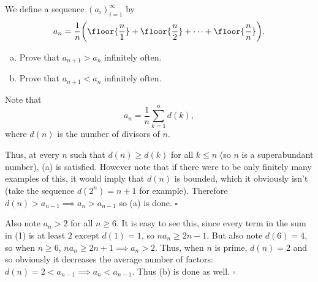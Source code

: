 
\begin{problem}[ISL 2006 N3]
    We define a sequence $(a_i)_{i=1}^\infty$ by
    \[a_n = \frac1n\bigg(\floor{\frac n1} + \floor{\frac n2} + \cdots + \floor{\frac nn}\bigg).\]
    \begin{enumerate}[(a),itemsep=-6pt]
        \item Prove that $a_{n+1}>a_n$ infinitely often.
        \item Prove that $a_{n+1}<a_n$ infinitely often.
    \end{enumerate}
\end{problem}

\begin{solution}[Ritwin]
    Note that \[a_n = \frac1n \sum_{k=1}^n d(k), \tag{1}\]
    where $d(n)$ is the number of divisors of $n$.
    
    Thus, at every $n$ such that $d(n) \geq d(k)$ for all $k \leq n$ (so $n$ is
    a superabundant number), (a) is satisfied. However note that if there were
    to be only finitely many examples of this, it would imply that $d(n)$ is
    bounded, which it obviously isn't (take the sequence $d(2^n) = n+1$ for example).
    Therefore $d(n) > a_{n-1} \implies a_n > a_{n-1}$ so (a) is done. $\square$
    
    Also note $a_n > 2$ for all $n \geq 6$. It is easy to see this, since every
    term in the sum in (1) is at least $2$ except $d(1) = 1$, so $na_n \geq 2n-1$.
    But also note $d(6) = 4$, so when $n \geq 6$, $na_n \geq 2n+1 \implies a_n > 2$.
    Thus, when $n$ is prime, $d(n) = 2$ and so obviously it decreases the average
    number of factors: $d(n) = 2 < a_{n-1} \implies a_n < a_{n-1}$. Thus (b) is
    done as well. $\square$
\end{solution}
